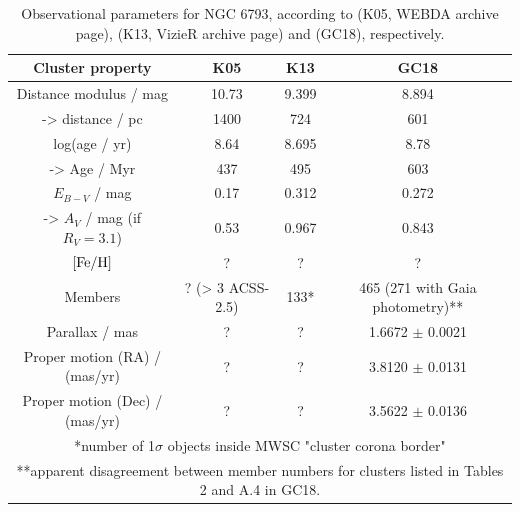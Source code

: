 \documentclass[12pt, a4paper]{report}
\begin{document}
\begin{table}
\begin{center}
\begin{tabular}{cccc}
\hline
Cluster property & K05 & K13 & GC18 \\
\hline
Distance modulus / mag & 10.73 & 9.399 & 8.894 \\
-> distance / pc & 1400 & 724 & 601 \\
log(age / yr) & 8.64 & 8.695 & 8.78 \\
-> Age / Myr & 437 & 495 & 603 \\
$E_{B-V}$ / mag & 0.17 & 0.312 & 0.272 \\
-> $A_{V}$ / mag (if $R_{V} = 3.1$) & 0.53 & 0.967 & 0.843 \\
$\textnormal{[Fe/H]}$ & ? & ? & ? \\
Members & ? (> 3 ACSS-2.5) & 133* & 465 (271 with Gaia photometry)** \\
Parallax / mas & ? & ? & 1.6672 $\pm$ 0.0021 \\
Proper motion (RA) / (mas/yr) & ? & ? & 3.8120 $\pm$ 0.0131 \\
Proper motion (Dec) / (mas/yr) & ? & ? & 3.5622 $\pm$ 0.0136 \\
\hline
\multicolumn{4}{c}{*number of 1$\sigma$ objects inside MWSC "cluster corona border"} \\
\multicolumn{4}{c}{**apparent disagreement between member numbers for clusters listed in Tables 2 and A.4 in GC18.} \\
\end{tabular}
\caption{Observational parameters for NGC 6793, according to \cite{2005A&A...438.1163K} (K05, WEBDA archive page), \cite{2013A&A...558A..53K} (K13, VizieR archive page) and \cite{2018A&A...616A..10G} (GC18), respectively.}
\label{NGC6793_obs}
\end{center}
\end{table}
\end{document}
